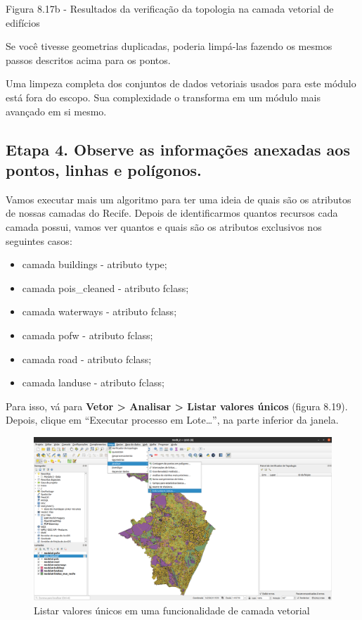\documentclass[
  portuguese,
]{krantz}
\providecommand{\tightlist}{%
  \setlength{\itemsep}{0pt}\setlength{\parskip}{0pt}}
\begin{document}
Figura 8.17b - Resultados da verificação da topologia na camada vetorial de edifícios

Se você tivesse geometrias duplicadas, poderia limpá-las fazendo os mesmos passos descritos acima para os pontos.

Uma limpeza completa dos conjuntos de dados vetoriais usados \hspace{0pt}\hspace{0pt}para este módulo está fora do escopo. Sua complexidade o transforma em um módulo mais avançado em si mesmo.

\hypertarget{etapa-4.-observe-as-informauxe7uxf5es-anexadas-aos-pontos-linhas-e-poluxedgonos.}{%
\subsection{\texorpdfstring{\textbf{Etapa 4. Observe as informações anexadas aos pontos, linhas e polígonos.}}{Etapa 4. Observe as informações anexadas aos pontos, linhas e polígonos.}}\label{etapa-4.-observe-as-informauxe7uxf5es-anexadas-aos-pontos-linhas-e-poluxedgonos.}}

Vamos executar mais um algoritmo para ter uma ideia de quais são os atributos de nossas camadas do Recife. Depois de identificarmos quantos recursos cada camada possui, vamos ver quantos e quais são os atributos exclusivos nos seguintes casos:

\begin{itemize}
\tightlist
\item
  camada buildings - atributo type;
\item
  camada pois\_cleaned - atributo fclass;
\item
  camada waterways - atributo fclass;
\item
  camada pofw - atributo fclass;
\item
  camada road - atributo fclass;
\item
  camada landuse - atributo fclass;
\end{itemize}

Para isso, vá para \textbf{Vetor \textgreater{} Analisar \textgreater{} Listar valores únicos} (figura 8.19). Depois, clique em ``Executar processo em Lote\ldots{}'', na parte inferior da janela.

\begin{figure}
\centering
\includegraphics{media/modulo8/fig819_a.png}
\caption{Listar valores únicos em uma funcionalidade de camada vetorial}
\end{figure}
\end{document}
